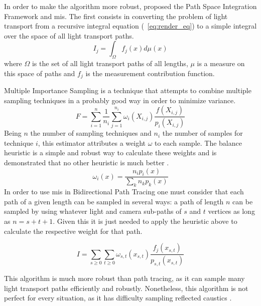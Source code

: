 In order to make the algorithm more robust, \cite{Veach} proposed the Path Space Integration Framework and \gls{mis}. The first consists in converting the problem of light transport from a recursive integral equation (~\ref{eq:render_eq}) to a simple integral over the space of all light transport paths.
\begin{equation}
I_j=\int_\Omega f_j(x)d\mu (x)
\label{eq:path_int}
\end{equation}
where $\Omega$ is the set of all light transport paths of all lengths, $\mu$ is a measure on this space of paths and $f_j$ is the measurement contribution function.

Multiple Importance Sampling is a technique that attempts to combine multiple sampling techniques in a probably good way in order to minimize variance.
\begin{equation}
F = \sum_{i=1}^n \frac{1}{n_i} \sum_{j=1}^{n_i} \omega_i (X_{i,j}) \frac{f(X_{i,j})}{p_i (X_{i,j})}
\label{eq:mis}
\end{equation}
Being $n$ the number of sampling techniques and $n_i$ the number of samples for technique $i$, this estimator attributes a weight $\omega$ to each sample. The balance heuristic is a simple and robust way to calculate these weights and is demonstrated that no other heuristic is much better \citep[p.~264]{Veach}.
\begin{equation}
\omega_i (x) = \frac{n_i p_i (x)}{\sum _k n_k p_k (x)}
\label{eq:balance}
\end{equation}
In order to use \gls{mis} in Bidirectional Path Tracing one must consider that each path of a given length can be sampled in several ways: a path of length $n$ can be sampled by using whatever light and camera sub-paths of $s$ and $t$ vertices as long as $n=s+t+1$. Given this it is just needed to apply the heuristic above to calculate the respective weight for that path.

\begin{equation}
I=\sum_{s \geq 0}\sum_{t \geq 0}\omega_{s,t}(x_{s,t})\frac{f_j (x_{s,t})}{p_{s,t}(x_{s,t})}
\label{eq:bpt}
\end{equation}

This algorithm is much more robust than path tracing, as it can sample many light transport paths efficiently and robustly. Nonetheless, this algorithm is not perfect for every situation, as it has difficulty sampling reflected caustics \citep{Georgiev}.


